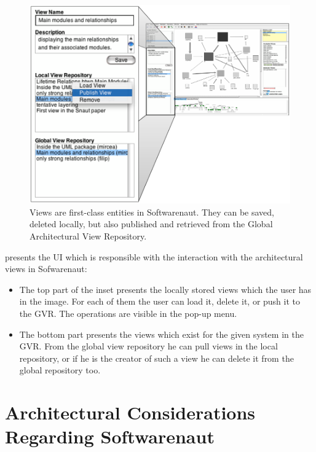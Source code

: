 \documentclass[preprint,12pt]{elsarticle}
\begin{document}
\begin{figure}[ht]
\begin{center}
\includegraphics[width=0.75\linewidth]{ViewOperations}
\caption{Views are first-class entities in Softwarenaut. They can be saved, deleted locally, but also published and retrieved from the Global Architectural View Repository.}
\end{center}
\end{figure}

 presents the UI which is responsible with the interaction with the architectural views in Sofwarenaut: 

\begin{itemize}

\item The top part of the inset presents the locally stored views which the user has in the image. For each of them the user can load it, delete it, or push it to the GVR. The operations are visible in the pop-up menu. %

\item The bottom part presents the views which exist for the given system in the GVR. From the global view repository he can pull views in the local repository, or if he is the creator of such a view he can delete it from the global repository too. 

\end{itemize}


\section {Architectural Considerations Regarding Softwarenaut} 
\end{document}
